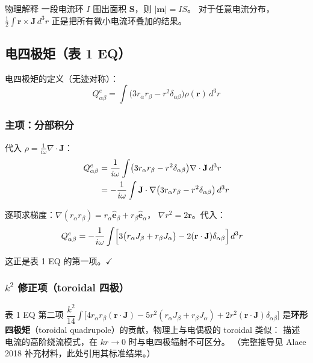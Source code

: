 \begin{stepbox}{物理解释}
一段电流环 $I$ 围出面积 $\mathbf{S}$，则 $|\mathbf{m}| = IS$。
对于任意电流分布，$\frac12\int\mathbf{r}\times\mathbf{J}\,d^3r$ 正是把所有微小电流环叠加的结果。
\end{stepbox}

\subsection{电四极矩（表 1 EQ）}

电四极矩的定义（无迹对称）：
\begin{equation}
  Q^e_{\alpha\beta} = \int \bigl(3r_\alpha r_\beta - r^2\delta_{\alpha\beta}\bigr)\rho(\mathbf{r})\,d^3r
\end{equation}

\subsubsection{主项：分部积分}

代入 $\rho = \frac{1}{i\omega}\nabla\cdot\mathbf{J}$：
\begin{align}
  Q^e_{\alpha\beta}
  &= \frac{1}{i\omega}\int \bigl(3r_\alpha r_\beta - r^2\delta_{\alpha\beta}\bigr)\nabla\cdot\mathbf{J}\,d^3r \notag\\
  &= -\frac{1}{i\omega}\int \mathbf{J}\cdot\nabla\bigl(3r_\alpha r_\beta - r^2\delta_{\alpha\beta}\bigr)\,d^3r
\end{align}

逐项求梯度：$\nabla(r_\alpha r_\beta) = r_\alpha\hat{\mathbf{e}}_\beta + r_\beta\hat{\mathbf{e}}_\alpha$，
$\nabla r^2 = 2\mathbf{r}$。代入：
\begin{align}
  Q^e_{\alpha\beta}
  &= -\frac{1}{i\omega}\int\Bigl[
    3\bigl(r_\alpha J_\beta + r_\beta J_\alpha\bigr) - 2(\mathbf{r}\cdot\mathbf{J})\delta_{\alpha\beta}\Bigr]\,d^3r
\end{align}

这正是表 1 EQ 的第一项。$\checkmark$

\subsubsection{$k^2$ 修正项（toroidal 四极）}

表 1 EQ 第二项 $\dfrac{k^2}{14}\int\bigl[4r_\alpha r_\beta(\mathbf{r}\cdot\mathbf{J})
- 5r^2(r_\alpha J_\beta + r_\beta J_\alpha) + 2r^2(\mathbf{r}\cdot\mathbf{J})\delta_{\alpha\beta}\bigr]$
是\textbf{环形四极矩}（toroidal quadrupole）的贡献，物理上与电偶极的 toroidal 类似：
描述电流的高阶绕流模式，在 $kr\to0$ 时与电四极辐射不可区分。
（完整推导见 Alaee 2018 补充材料，此处引用其标准结果。）

